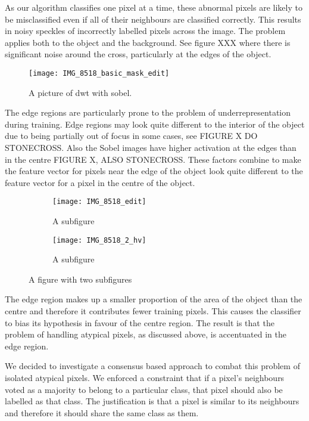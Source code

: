\documentclass[12pt]{IIBproject}
\begin{document}
As our algorithm classifies one pixel at a time, these abnormal pixels are likely to be misclassified even if all of their neighbours are classified correctly. This results in noisy speckles of incorrectly labelled pixels across the image. The problem applies both to the object and the background. See figure XXX where there is significant noise around the cross, particularly at the edges of the object. 
\begin{figure}[H]
  \caption{A picture of dwt with sobel.}
  \centering
    \texttt{[image: IMG\_8518\_basic\_mask\_edit]}
\end{figure}
The edge regions are particularly prone to the problem of underrepresentation during training. Edge regions may look quite different to the interior of the object due to being partially out of focus in some cases, see FIGURE X DO STONECROSS. Also the Sobel images have higher activation at the edges than in the centre FIGURE X, ALSO STONECROSS. These factors combine to make the feature vector for pixels near the edge of the object look quite different to the feature vector for a pixel in the centre of the object.
\begin{figure}[H]
\centering
\begin{subfigure}{.45\textwidth}
  \centering
  \texttt{[image: IMG\_8518\_edit]}
  \caption{A subfigure}
  \label{fig:sub2}
\end{subfigure}
\begin{subfigure}{.45\textwidth}
  \centering
  \texttt{[image: IMG\_8518\_2\_hv]}
  \caption{A subfigure}
  \label{fig:sub1}
\end{subfigure}%

\caption{A figure with two subfigures}
\label{fig:test}
\end{figure}
 The edge region makes up a smaller proportion of the area of the object than the centre and therefore it contributes fewer training pixels. This causes the classifier to bias its hypothesis in favour of the centre region. The result is that the problem of handling atypical pixels, as discussed above, is accentuated in the edge region. 
 
We decided to investigate a consensus based approach to combat this problem of isolated atypical pixels. We enforced a constraint that if a pixel's neighbours voted as a majority to belong to a particular class, that pixel should also be labelled as that class. The justification is that a pixel is similar to its neighbours and therefore it should share the same class as them. 
\end{document}
